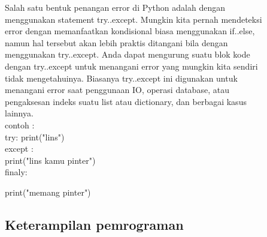Salah satu bentuk penangan error di Python adalah dengan\\ menggunakan statement try..except. Mungkin kita pernah mendeteksi\\ error dengan memanfaatkan kondisional biasa menggunakan if..else,\\ namun hal tersebut akan lebih praktis ditangani bila dengan\\ menggunakan try..except. Anda dapat mengurung suatu blok kode\\ dengan try..except untuk menangani error yang mungkin kita sendiri\\ tidak mengetahuinya. Biasanya try..except ini digunakan untuk\\ menangani error saat penggunaan IO, operasi database, atau\\ pengaksesan indeks suatu list atau dictionary, dan berbagai kasus\\ lainnya.\\
contoh :\\
try: 
print("lins")\\
except :\\
print("lins kamu pinter")\\
finaly:

print("memang pinter")

\subsection{Keterampilan pemrograman}

